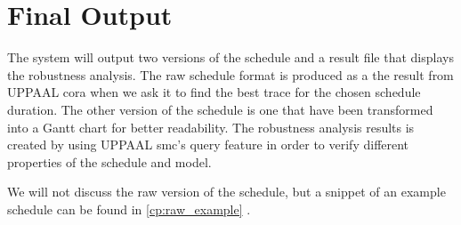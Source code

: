 \section{Final Output}\label{sec:final}
The system will output two versions of the schedule and a result file that displays the robustness analysis. The raw schedule format is produced as a the result from UPPAAL \gls{cora} when we ask it to find the best trace for the chosen schedule duration. The other version of the schedule is one that have been transformed into a Gantt chart for better readability. The robustness analysis results is created by using UPPAAL \gls{smc}'s query feature in order to verify different properties of the schedule and model.

We will not discuss the raw version of the schedule, but a snippet of an example schedule can be found in \cref{cp:raw_example} .



